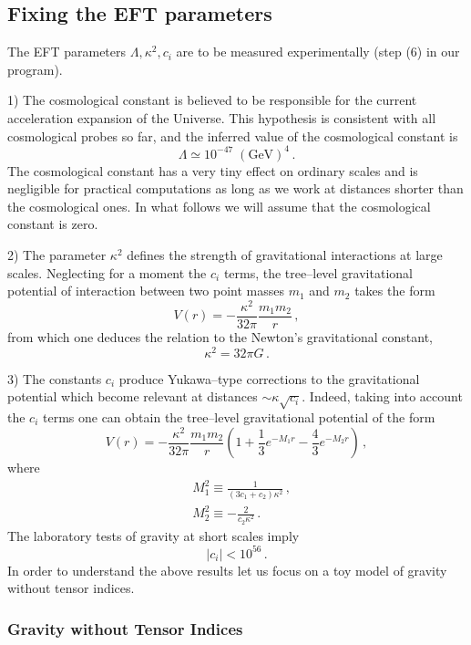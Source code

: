 \documentclass[12pt]{article}
\newcommand{\be}{\begin{equation}}
\newcommand{\ee}{\end{equation}}
\begin{document}
\subsection{Fixing the EFT parameters}

The EFT parameters $\Lambda, \kappa^2, c_i$ are to be measured experimentally (step (6) in our program).

1) The cosmological constant is believed to be responsible for the current acceleration expansion
of the Universe. This hypothesis is consistent with all cosmological probes so far,
and the inferred value of the cosmological constant is
\be
\Lambda\simeq 10^{-47}\;(\text{GeV})^4 \,.
\ee
The cosmological constant has a very tiny effect on ordinary scales and is negligible for
practical computations as long as we work at distances shorter than the cosmological ones.
In what follows we will assume that the cosmological constant is zero.


2) The parameter $\kappa^2$ defines the strength of gravitational interactions at large scales.
Neglecting for a moment the $c_i$ terms, the tree--level gravitational potential of interaction between two point masses $m_1$ and $m_2$
takes the form
\be
V(r)=-\frac{\kappa^2}{32\pi} \frac{m_1m_2}{r}\,,
\ee
from which one deduces the relation to the Newton's gravitational constant,
\be
 \kappa^2=32 \pi G\,.
\ee

3) The constants $c_i$ produce Yukawa--type corrections to the gravitational potential which become
relevant at distances $\sim \kappa \sqrt{c_i}$. Indeed, taking into account the $c_i$ terms
one can obtain the tree--level gravitational potential of the form \cite{Stelle:1977ry}
\be
V(r)=-\frac{\kappa^2}{32\pi} \frac{m_1m_2}{r}\left(1+\frac{1}{3}e^{-M_1r}-\frac{4}{3}e^{-M_2r}\right)\,,
\ee
where
\be
\label{eq:masses}
\begin{split}
& M_1^2\equiv \frac{1}{(3c_1+c_2)\kappa^2}\,,\\
& M_2^2\equiv -\frac{2}{c_2\kappa^2}\,.
\end{split}
\ee
The laboratory tests of gravity at short scales imply
\be
|c_i|<10^{56}\,.
\ee
In order to understand the above results let us focus
on a toy model of gravity without tensor indices.

\subsubsection{Gravity without Tensor Indices}
\end{document}
